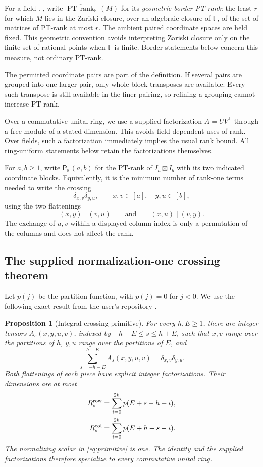 \documentclass[11pt]{article}
\newtheorem{proposition}[theorem]{Proposition}
\theoremstyle{definition}
\theoremstyle{remark}
\newcommand{\F}{\mathbb F}
\newcommand{\PT}{\operatorname{PT\!\text{-}rank}}
\newcommand{\cross}{\mathsf P}
\newcommand{\trsp}{\mathsf T}
\begin{document}
For a field $\F$, write $\overline{\PT}_{\F}(M)$ for its
\emph{geometric border PT-rank}: the least $r$ for which $M$ lies
in the Zariski closure, over an algebraic closure of $\F$, of the
set of matrices of PT-rank at most $r$.  The ambient paired
coordinate spaces are held fixed.  This geometric convention
avoids interpreting Zariski closure only on the finite set of
rational points when $\F$ is finite.  Border statements below
concern this measure, not ordinary PT-rank.

The permitted coordinate pairs are part of the definition. If
several pairs are grouped into one larger pair, only whole-block
transposes are available. Every such transpose is still available
in the finer pairing, so refining a grouping cannot increase
PT-rank.

Over a commutative unital ring, we use a supplied factorization
$A=UV^{\trsp}$ through a free module of a stated dimension. This
avoids field-dependent uses of rank. Over fields, such a
factorization immediately implies the usual rank bound. All
ring-uniform statements below retain the factorizations themselves.

For $a,b\ge1$, write $\cross_{\F}(a,b)$ for the PT-rank of
$I_a\boxtimes I_b$ with its two indicated coordinate blocks.
Equivalently, it is the minimum number of rank-one terms needed to
write the crossing
\[
 \delta_{x,v}\delta_{y,u},\qquad
 x,v\in[a],\quad y,u\in[b],
\]
using the two flattenings
\[
 (x,y)\mid(v,u)
 \qquad\text{and}\qquad
 (x,u)\mid(v,y).
\]
The exchange of $u,v$ within a displayed column index is only a
permutation of the columns and does not affect the rank.

\subsection{The supplied normalization-one crossing theorem}

Let $p(j)$ be the partition function, with $p(j)=0$ for $j<0$.
We use the following exact result from the user's repository
\cite{integralcrossing}.

\begin{proposition}[Integral crossing primitive]
\label{prop:primitive}
For every $h,E\ge1$, there are integer tensors
$A_s(x,y,u,v)$, indexed by $-h-E\le s\le h+E$, such that $x,v$
range over the partitions of $h$, $y,u$ range over the partitions
of $E$, and
\begin{equation}
\label{eq:primitive}
 \sum_{s=-h-E}^{h+E}A_s(x,y,u,v)
 =\delta_{x,v}\delta_{y,u}.
\end{equation}
Both flattenings of each piece have explicit integer
factorizations. Their dimensions are at most
\begin{align}
 R_s^{\rm row}&=\sum_{i=0}^{2h}p(E+s-h+i),\label{eq:rowrank}\\
 R_s^{\rm col}&=\sum_{i=0}^{2h}p(E+h-s-i).
 \label{eq:colrank}
\end{align}
The normalizing scalar in \eqref{eq:primitive} is one. The identity
and the supplied factorizations therefore specialize to every
commutative unital ring.
\end{proposition}
\end{document}
